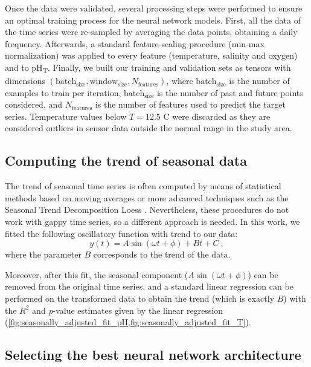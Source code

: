 Once the data were validated, several processing steps were performed to ensure
an optimal training process for the neural network models. First, all the data
of the time series were re-sampled by averaging the data points, obtaining a
daily frequency. Afterwards, a standard feature-scaling procedure (min-max
normalization) was applied to every feature (temperature, salinity and oxygen)
and to pH\textsubscript{T}. Finally, we built our training and validation sets
as tensors with dimensions $(\textrm{batch}_\textrm{size},
    \textrm{window}_\textrm{size}, N_{\textrm{features}})$,  where
$\textrm{batch}_\textrm{size}$ is the number of examples to train per
iteration, $\textrm{batch}_\textrm{size}$ is the number of past and future
points considered, and $N_{\textrm{features}}$ is the number of features used
to predict the target series. Temperature values below $T=12.5$ \textdegree C
were discarded as they are considered outliers in sensor data outside the
normal range in the study area.

\subsection{Computing the trend of seasonal data}

The trend of seasonal time series is often computed by means of statistical
methods based on moving averages or more advanced techniques such as the
Seasonal Trend Decomposition Loess \cite{cleveland1990stl}. Nevertheless, these
procedures do not work with gappy time series, so a different approach is
needed. In this work, we fitted the following oscillatory function with trend
to
our data:
\begin{equation}\label{eq:seasonal_fit}
    y(t)=A\sin(\omega t+\phi)+Bt+C \ ,
\end{equation}
where the parameter $B$ corresponds to the trend of the data.

Moreover, after this fit, the seasonal component ($A\sin(\omega t + \phi)$)
can be removed from the original time series, and a standard linear regression
can be performed on the transformed data to obtain the trend (which is exactly
$B$) with the $R^2$ and \emph{p}-value estimates given by the linear regression
(\cref{fig:seasonally_adjusted_fit_pH,fig:seasonally_adjusted_fit_T}).

\subsection{Selecting the best neural network architecture}

